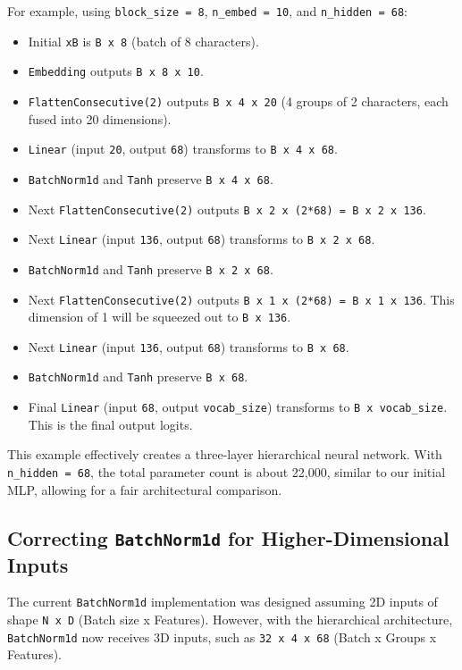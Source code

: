 For example, using \texttt{block\_size = 8}, \texttt{n\_embed = 10}, and \texttt{n\_hidden = 68}:
\begin{itemize}
    \item Initial \texttt{xB} is \texttt{B x 8} (batch of 8 characters).
    \item \texttt{Embedding} outputs \texttt{B x 8 x 10}.
    \item \texttt{FlattenConsecutive(2)} outputs \texttt{B x 4 x 20} (4 groups of 2 characters, each fused into 20 dimensions).
    \item \texttt{Linear} (input \texttt{20}, output \texttt{68}) transforms to \texttt{B x 4 x 68}.
    \item \texttt{BatchNorm1d} and \texttt{Tanh} preserve \texttt{B x 4 x 68}.
    \item Next \texttt{FlattenConsecutive(2)} outputs \texttt{B x 2 x (2*68) = B x 2 x 136}.
    \item Next \texttt{Linear} (input \texttt{136}, output \texttt{68}) transforms to \texttt{B x 2 x 68}.
    \item \texttt{BatchNorm1d} and \texttt{Tanh} preserve \texttt{B x 2 x 68}.
    \item Next \texttt{FlattenConsecutive(2)} outputs \texttt{B x 1 x (2*68) = B x 1 x 136}. This dimension of 1 will be squeezed out to \texttt{B x 136}.
    \item Next \texttt{Linear} (input \texttt{136}, output \texttt{68}) transforms to \texttt{B x 68}.
    \item \texttt{BatchNorm1d} and \texttt{Tanh} preserve \texttt{B x 68}.
    \item Final \texttt{Linear} (input \texttt{68}, output \texttt{vocab\_size}) transforms to \texttt{B x vocab\_size}. This is the final output logits.
\end{itemize}
This example effectively creates a three-layer hierarchical neural network. With \texttt{n\_hidden = 68}, the total parameter count is about 22,000, similar to our initial MLP, allowing for a fair architectural comparison.

\subsection{Correcting \texttt{BatchNorm1d} for Higher-Dimensional Inputs}

The current \texttt{BatchNorm1d} implementation was designed assuming 2D inputs of shape \texttt{N x D} (Batch size x Features). However, with the hierarchical architecture, \texttt{BatchNorm1d} now receives 3D inputs, such as \texttt{32 x 4 x 68} (Batch x Groups x Features).

